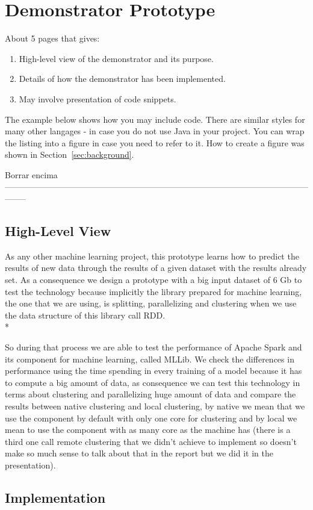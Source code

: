 \section{Demonstrator Prototype}
\label{sec:prototype}

About 5 pages that gives:

\begin{enumerate}
  
\item High-level view of the demonstrator and its purpose.

\item Details of how the demonstrator has been implemented.

\item May involve presentation of code snippets.

\end{enumerate}

The example below shows how you may include code. There are similar
styles for many other langages - in case you do not use Java in your
project. You can wrap the listing into a figure in case you need to
refer to it. How to create a figure was shown in Section~\ref{sec:background}.
  


Borrar encima --------------------------------------------------------------------------------------------------------------------



\subsection{High-Level View}
As any other machine learning project, this prototype learns how to predict the results of new data through the results of a given dataset with the results already set. As a consequence we design a prototype with a big input dataset of 6 Gb to test the technology because implicitly the library prepared for machine learning, the one that we are using, is splitting, parallelizing and clustering when we use the data structure of this library call RDD.\\*

So during that process we are able to test the performance of Apache Spark and its component for machine learning, called MLLib. We check the differences in performance using the time spending in every training of a model because it has to compute a big amount of data, as consequence we can test this technology in terms about clustering and parallelizing huge amount of data and compare the results between native clustering and local clustering, by native we mean that we use the component by default with only one core for clustering and by local we mean to use the component with as many core as the machine has (there is a third one call remote clustering that we didn’t achieve to implement so doesn’t make so much sense to talk about that in the report but we did it in the presentation).

\subsection{Implementation}